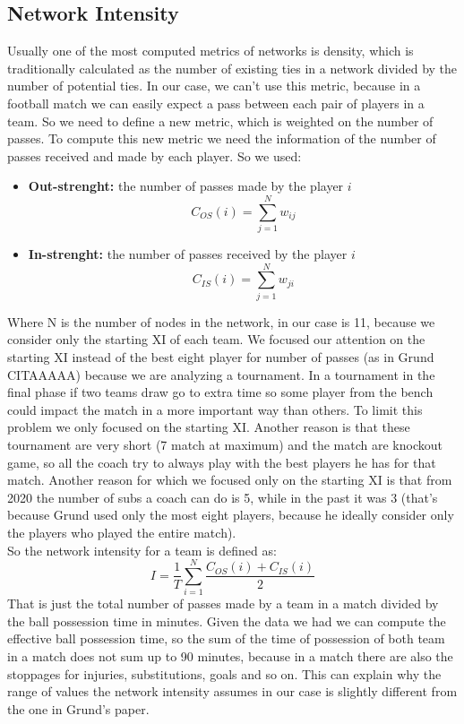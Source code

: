 \documentclass[12pt, a4paper]{article}
\begin{document}
\subsection{Network Intensity}
Usually one of the most computed metrics of networks is density, which
is traditionally calculated as the number of existing ties in a network divided by the number of potential ties. In our case, we can't use this metric, because in a football match we can easily expect a pass between each pair of players in a team. So we need to define a new metric, which is weighted on the number of passes. To compute this new metric we need the information of the number of passes received and made by each player. So we used: 
\begin{itemize}
        \item \textbf{Out-strenght:} the number of passes made by the player $i$
        $$ C_{OS}(i) = \sum^{N}_{j=1}w_{ij}$$
        \item \textbf{In-strenght:} the number of passes received by the player $i$
         $$C_{IS}(i) = \sum^{N}_{j=1}w_{ji}$$
\end{itemize}
Where N is the number of nodes in the network, in our case is 11, because we consider only the starting XI of each team. We focused our attention on the starting XI instead of the best eight player for number of passes (as in Grund CITAAAAA) because we are analyzing a tournament. In a tournament in the final phase if two teams draw go to extra time so some player from the bench could impact the match in a more important way than others. To limit this problem we only focused on the starting XI. Another reason is that these tournament are very short (7 match at maximum) and the match are knockout game, so all the coach try to always play with the best players he has for that match. Another reason for which we focused only on the starting XI is that from 2020 the number of subs a coach can do is 5, while in the past it was 3 (that's because Grund used only the most eight players, because he ideally consider only the players who played the entire match). \\
So the network intensity for a team is defined as:
$$I = \frac{1}{T}\sum^N_{i=1} \frac{ C_{OS}(i) +  C_{IS}(i)}{2}$$
That is just the total number of passes made by a team in a match divided by the ball possession time in minutes. Given the data we had we can compute the effective ball possession time, so the sum of the time of possession of both team in a match does not sum up to 90 minutes, because in a match there are also the stoppages for injuries, substitutions, goals and so on. This can explain why the range of values the network intensity assumes in our case is slightly different from the one in Grund's paper.
\\
\end{document}
